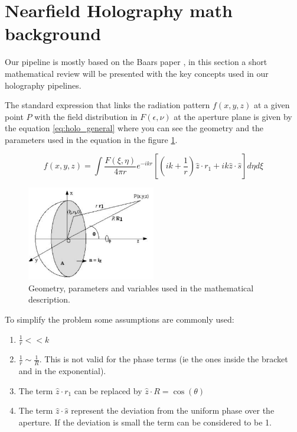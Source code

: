 \section{Nearfield Holography math background}

Our pipeline is mostly based on the Baars paper , in this section a short mathematical review will be presented with the key concepts used in our holography pipelines.


The standard expression that links the radiation pattern $f(x,y,z)$ at a given point $P$ with the field distribution in $F(\epsilon, \nu)$ at the aperture plane is given by the equation \ref{eq:holo_general} where you can see the geometry and the parameters used in the equation in the figure \ref{fig:antenna_holo}.


\begin{equation}
    f(x,y,z) = \int \frac{F(\xi,\eta)}{4\pi r} e^{-ikr} \left[ \left(ik+\frac{1}{r} \right) \hat{z}\cdot r_1 + ik\hat{z}\cdot\hat{s} \right] d\eta d\xi 
    \label{eq:holo_general}
\end{equation}


\begin{figure}
    \centering
    \includegraphics[width=0.5\textwidth]{images/antenna_holo.png}
    \caption{Geometry, parameters and variables used in the mathematical description.}
    \label{fig:antenna_holo}
\end{figure}


To simplify the problem some assumptions are commonly used:
\begin{enumerate}
    \item $\frac{1}{r} << k$
    \item $\frac{1}{r} \sim \frac{1}{R}$. This is not valid for the phase terms (ie the ones inside the bracket and in the exponential).
    \item  The term $\hat{z}\cdot r_1$ can be replaced by $\hat{z}\cdot R = \cos(\theta)$
    \item The term $\hat{z}\cdot \hat{s}$ represent the deviation from the uniform phase over the aperture. If the deviation is small the term can be considered to be 1.
\end{enumerate}

